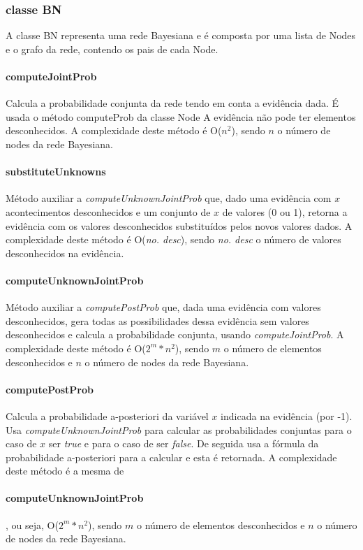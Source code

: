 \documentclass[12pt,a4paper]{article}
\begin{document}
\begin{multicols}{2}
	\subsubsection{classe BN}
	A classe BN representa uma rede Bayesiana e é composta por uma lista de Nodes e o grafo da rede, contendo os pais de cada Node.
	\paragraph{computeJointProb}
	Calcula a probabilidade conjunta da rede tendo em conta a evidência dada. É usada o método computeProb da classe Node
	A evidência não pode ter elementos desconhecidos.
	A complexidade deste método é O($n^2$), sendo $n$ o número de nodes da rede Bayesiana.
	\paragraph{substituteUnknowns}
	Método auxiliar a \textit{computeUnknownJointProb} que, dado uma evidência com $x$ acontecimentos desconhecidos e um conjunto de $x$ de valores (0 ou 1), retorna a evidência com os valores desconhecidos substituídos pelos novos valores dados.
	A complexidade deste método é O(\textit{no. desc}), sendo \textit{no. desc} o número de valores desconhecidos na evidência.
	\paragraph{computeUnknownJointProb}
	Método auxiliar a \textit{computePostProb} que, dada uma evidência com valores desconhecidos, gera todas as possibilidades dessa evidência sem valores desconhecidos e calcula a probabilidade conjunta, usando \textit{computeJointProb}.
	A complexidade deste método é O($2^m * n^2$), sendo $m$ o número de elementos desconhecidos e $n$ o número de nodes da rede Bayesiana. 
	\paragraph{computePostProb}
	Calcula a probabilidade a-posteriori da variável $x$ indicada na evidência (por -1). Usa \textit{computeUnknownJointProb} para calcular as probabilidades conjuntas para o caso de $x$ ser \textit{true} e para o caso de ser \textit{false}.
	De seguida usa a fórmula da probabilidade a-posteriori para a calcular e esta é retornada.
	A complexidade deste método é a mesma de \paragraph{computeUnknownJointProb}, ou seja, O($2^m * n^2$), sendo $m$ o número de elementos desconhecidos e $n$ o número de nodes da rede Bayesiana.

\end{multicols}
\end{document}
